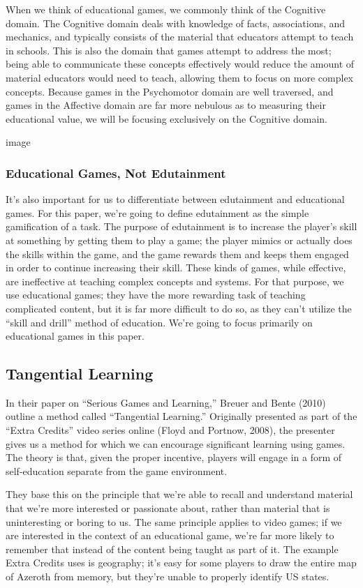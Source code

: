 \documentclass[12pt]{report}
\begin{document}
			When we think of educational games, we commonly think of the Cognitive domain. The Cognitive domain deals with knowledge of facts, associations, and mechanics, and typically consists of the material that educators attempt to teach in schools. This is also the domain that games attempt to address the most; being able to communicate these concepts effectively would reduce the amount of material educators would need to teach, allowing them to focus on more complex concepts. Because games in the Psychomotor domain are well traversed, and games in the Affective domain are far more nebulous as to measuring their educational value, we will be focusing exclusively on the Cognitive domain.

			image

			\subsubsection{Educational Games, Not Edutainment}
				It's also important for us to differentiate between edutainment and educational games. For this paper, we're going to define edutainment as the simple gamification of a task. The purpose of edutainment is to increase the player's skill at something by getting them to play a game; the player mimics or actually does the skills within the game, and the game rewards them and keeps them engaged in order to continue increasing their skill. These kinds of games, while effective, are ineffective at teaching complex concepts and systems. For that purpose, we use educational games; they have the more rewarding task of teaching complicated content, but it is far more difficult to do so, as they can't utilize the “skill and drill” method of education. We're going to focus primarily on educational games in this paper.

	\subsection{Tangential Learning}
		In their paper on “Serious Games and Learning,” Breuer and Bente (2010) outline a method called “Tangential Learning.” Originally presented as part of the “Extra Credits” video series online (Floyd and Portnow, 2008), the presenter gives us a method for which we can encourage significant learning using games. The theory is that, given the proper incentive, players will engage in a form of self-education separate from the game environment.
		
		They base this on the principle that we're able to recall and understand material that we're more interested or passionate about, rather than material that is uninteresting or boring to us. The same principle applies to video games; if we are interested in the context of an educational game, we're far more likely to remember that instead of the content being taught as part of it. The example Extra Credits uses is geography; it's easy for some players to draw the entire map of Azeroth from memory, but they're unable to properly identify US states.
		
\end{document}
